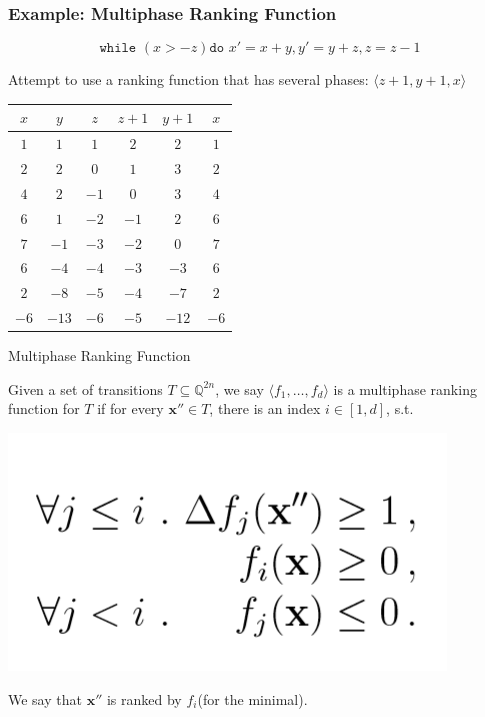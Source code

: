 \documentclass[11pt]{beamer}
\begin{document}
\begin{frame}\frametitle{Example: Multiphase Ranking Function}
\[\texttt{while }( x > -z) \texttt{do } x' = x + y, y' = y + z, z = z - 1\]

Attempt to use a ranking function that has several phases: 
$\langle z + 1, y + 1, x\rangle$
\begin{center}
\begin{tabular}{|c|c|c|c|c|c|}
\hline 
$x$&$y$&$z$&$z+1$&$y+1$&$x$\\
\hline
$1$&$1$&$1$&$2$&$2$&$1$\\
$2$&$2$&$0$&$1$&$3$&$2$\\
$4$&$2$&$-1$&$0$&$3$&$4$\\
\hline
$6$&$1$&$-2$&$-1$&$2$&$6$\\
$7$&$-1$&$-3$&$-2$&$0$&$7$\\
\hline
$6$&$-4$&$-4$&$-3$&$-3$&$6$\\
$2$&$-8$&$-5$&$-4$&$-7$&$2$\\
\hline
$-6$&$-13$&$-6$&$-5$&$-12$&$-6$\\
\hline
\end{tabular}
\end{center}
\end{frame}



\begin{frame}{Multiphase Ranking Function}
\begin{definition}
Given a set of transitions $T\subseteq \mathbb{Q}^{2n}$, we say $\langle f_1, \ldots, f_d\rangle$ is a multiphase ranking function for $T$ if for every $\textbf{x}'' \in T$, there is an index $i\in [1, d]$, s.t.

\begin{center}
\includegraphics[scale = 0.3]{3.png}
\end{center}
We say that $\textbf{x}''$ is ranked by $f_i$(for the minimal).
\end{definition}


\end{frame}
\end{document}
